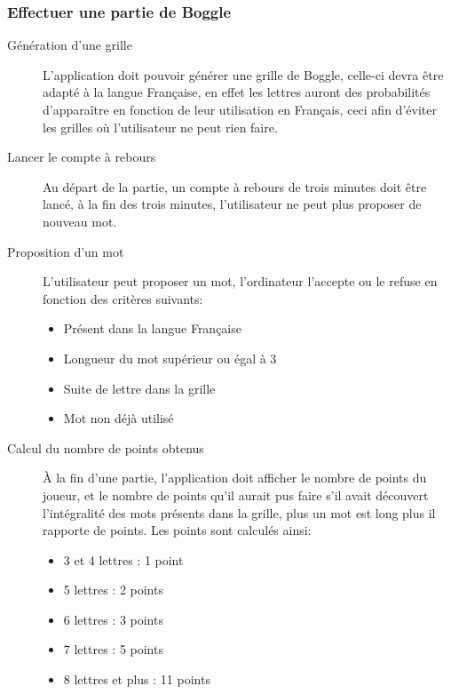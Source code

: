 \documentclass[12pt,a4paper,openany]{article}
\begin{document}
	\subsubsection{Effectuer une partie de Boggle}
		\begin{description}
				\item[Génération d'une grille] L'application doit pouvoir générer une grille de Boggle, celle-ci devra être adapté à la langue Française, en
				effet les lettres auront des probabilités d'apparaître en fonction de leur utilisation en Français, ceci afin d'éviter les grilles où
				l'utilisateur ne peut rien faire.
				\item[Lancer le compte à rebours] Au départ de la partie, un compte à rebours de trois minutes doit être lancé, à la fin des trois
					minutes, l'utilisateur ne peut plus proposer de nouveau mot.
				\item[Proposition d'un mot] L'utilisateur peut proposer un mot, l'ordinateur l'accepte ou le refuse en fonction des critères suivants:
					\begin{itemize}
						\item Présent dans la langue Française
						\item Longueur du mot supérieur ou égal à 3
						\item Suite de lettre dans la grille
						\item Mot non déjà utilisé
					\end{itemize}
				\item[Calcul du nombre de points obtenus] À la fin d'une partie, l'application doit afficher le nombre de points du joueur, et le
					nombre de points qu'il aurait pus faire s'il avait découvert l'intégralité des mots présents dans la grille, plus un mot est long
					plus il rapporte de points. Les points sont calculés ainsi:
					\begin{itemize}
						\item 3 et 4 lettres : 1 point
						\item 5 lettres : 2 points
						\item 6 lettres : 3 points
						\item 7 lettres : 5 points
						\item 8 lettres et plus : 11 points
					\end{itemize}
		\end{description}
\end{document}
